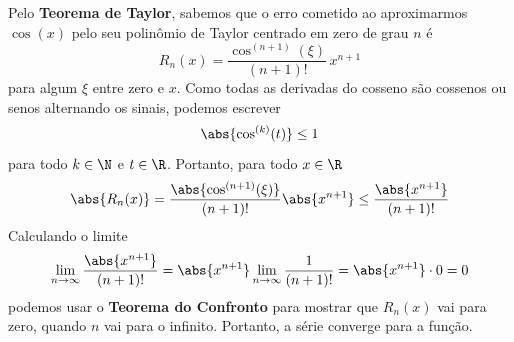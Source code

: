 \documentclass[a4paper,12pt,fleqn]{article}
\begin{document}
\begin{answer}
  Pelo \textbf{Teorema de Taylor}, sabemos que o erro cometido ao aproximarmos
  $\cos(x)$ pelo seu polinômio de Taylor centrado em zero de grau $n$ é
  \[
    R_n(x) = \frac{\cos^{(n+1)}(\xi)}{(n+1)!} \, x^{n+1}
  \]
  para algum $\xi$ entre zero e $x$.
  Como todas as derivadas do cosseno são cossenos ou senos alternando os sinais,
  podemos escrever
  \[
    \abs{\cos^{(k)}(t)} \leq 1
  \]
  para todo \(k\in\N\) e \(t\in\R\).
  Portanto, para todo \(x\in\R\)
  \[
    \abs{R_n(x)}
    = \frac{\abs{\cos^{(n+1)}(\xi)}}{(n+1)!}\abs{x^{n+1}}
    \leq \frac{\abs{x^{n+1}}}{(n+1)!}
  \]
  Calculando o limite
  \[
    \lim_{n\to\infty} \frac{\abs{x^{n+1}}}{(n+1)!}
    = \abs{x^{n+1}} \lim_{n\to\infty} \frac{1}{(n+1)!}
    = \abs{x^{n+1}} \cdot 0
    = 0
  \]
  podemos usar o \textbf{Teorema do Confronto} para mostrar que \(R_n(x)\)
  vai para zero, quando $n$ vai para o infinito.
  Portanto, a série converge para a função.
\end{answer}

\end{document}
